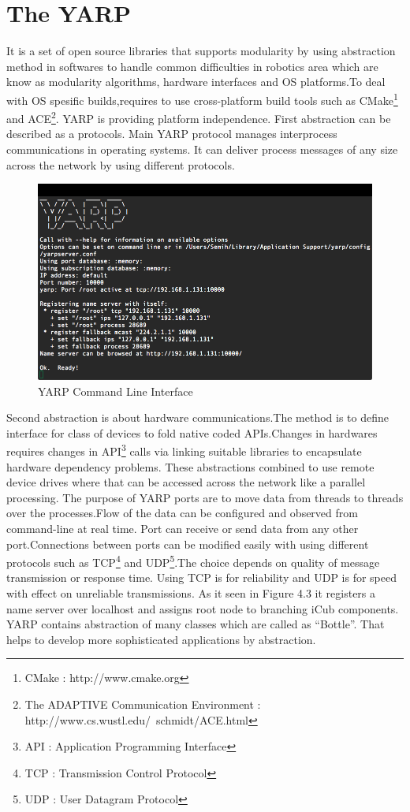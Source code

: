 \documentclass[a4paper, 12pt]{report}
\begin{document}
\section{The YARP}
It is a set of open source libraries that supports modularity by 
using abstraction method in softwares to handle common difficulties in 
robotics area which are know as modularity algorithms, hardware interfaces and 
OS platforms.To deal with OS spesific builds,requires to use cross-platform 
build tools such as CMake\footnote{CMake : http://www.cmake.org} and 
ACE\footnote{The ADAPTIVE Communication Environment :
  http://www.cs.wustl.edu/~schmidt/ACE.html}. YARP is providing platform 
independence. First abstraction can be described as a protocols. Main YARP 
protocol manages interprocess communications in operating systems. It can 
deliver process messages of any size across the network by using different 
protocols.
\begin{figure}[h!]
  \centering
  \includegraphics[width=1.0\linewidth]{yarp}
  \caption{YARP Command Line Interface}
  \label{fig:yarp}
\end{figure}
Second abstraction is about hardware communications.The method is to define 
interface for class of devices to fold native coded APIs.Changes in hardwares 
requires changes in API\footnote{API : Application Programming Interface} calls 
via linking suitable libraries to encapsulate 
hardware dependency problems. These abstractions combined to use remote 
device drives where that can be accessed across the network like a parallel 
processing.
The purpose of YARP ports are to move data from threads to threads over the 
processes.Flow of the data can be configured and observed from command-line 
at real time. Port can receive or send data from any other port.Connections 
between ports can be modified easily with using different protocols such as 
TCP\footnote{TCP : Transmission Control Protocol} and UDP\footnote{UDP : User 
Datagram Protocol}.The choice depends on quality of message transmission or 
response 
time. Using TCP is for reliability and UDP is for speed with effect on 
unreliable transmissions. As it seen in Figure 4.3 it registers a name server 
over localhost and assigns root node to branching iCub components. YARP 
contains abstraction of many classes which are called as “Bottle”. That helps 
to develop more sophisticated applications by abstraction.
\newpage
\end{document}

